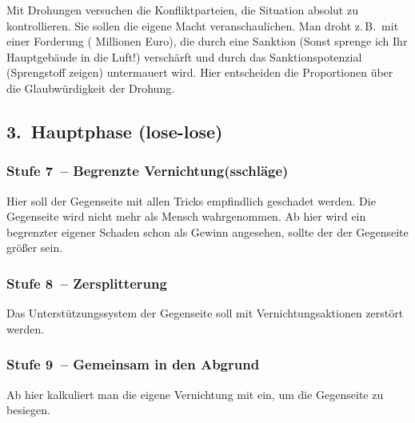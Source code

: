Mit Drohungen versuchen die Konfliktparteien, die Situation absolut zu kontrollieren. Sie sollen die eigene Macht veranschaulichen. Man droht z.\,B.~mit einer Forderung ( Millionen Euro\grqq), die durch eine Sanktion (\glqq Sonst sprenge ich Ihr Hauptgebäude in die Luft!\grqq) verschärft und durch das Sanktionspotenzial (Sprengstoff zeigen) untermauert wird. Hier entscheiden die Proportionen über die Glaubwürdigkeit der Drohung.


\subsection{3.~Hauptphase (lose-lose)}

\subsubsection{Stufe 7~-- Begrenzte Vernichtung(sschläge)}

Hier soll der Gegenseite mit allen Tricks empfindlich geschadet werden. Die Gegenseite wird nicht mehr als Mensch wahrgenommen. Ab hier wird ein begrenzter eigener Schaden schon als Gewinn angesehen, sollte der der Gegenseite größer sein.

\subsubsection{Stufe 8~-- Zersplitterung}

Das Unterstützungssystem der Gegenseite soll mit Vernichtungsaktionen zerstört werden.

\subsubsection{Stufe 9~-- Gemeinsam in den Abgrund}

Ab hier kalkuliert man die eigene Vernichtung mit ein, um die Gegenseite zu besiegen.
